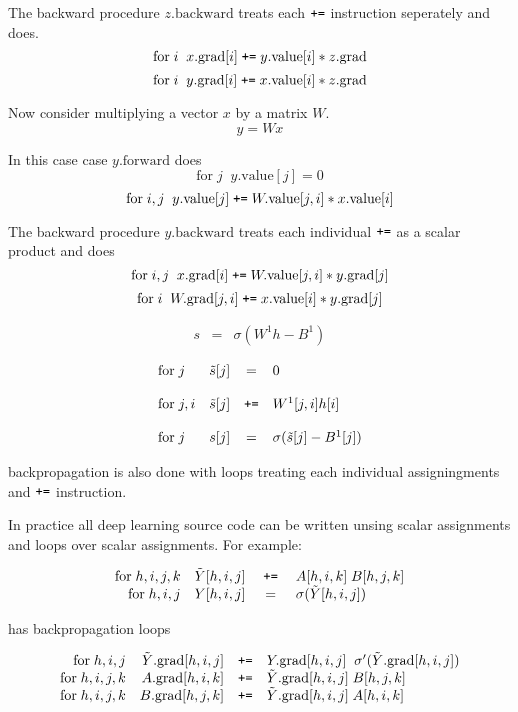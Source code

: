 {\vfill
The backward procedure $z.\mathrm{backward}$ treats each $\mbox{\tt +=}$ instruction seperately and does.
$$\mathrm{for}\;i\;\;x.\mathrm{grad}[i] \;\mbox{\tt +=}\;y.\mathrm{value}[i]*z.\mathrm{grad}$$
$$\mathrm{for}\;i\;\;y.\mathrm{grad}[i] \;\mbox{\tt +=}\;x.\mathrm{value}[i]*z.\mathrm{grad}$$

Now consider multiplying a vector $x$ by a matrix $W$.
$$y = Wx$$

\vfill
In this case case $y.\mathrm{forward}$ does
$$\mathrm{for}\;j\;\;y.\mathrm{value}[j] = 0$$
$$\mathrm{for}\;i,j\;\;y.\mathrm{value}[j] \;\mbox{\tt +=}\;W.\mathrm{value}[j,i]*x.\mathrm{value}[i]$$

\vfill
The backward procedure $y.\mathrm{backward}$ treats each individual $\mbox{\tt +=}$ as a scalar product and does
$$\mathrm{for}\;i,j\;\;x.\mathrm{grad}[i] \;\mbox{\tt +=}\;W.\mathrm{value}[j,i]*y.\mathrm{grad}[j]$$
$$\mathrm{for}\;i\;\;W.\mathrm{grad}[j,i] \;\mbox{\tt +=}\;x.\mathrm{value}[i]*y.\mathrm{grad}[j]$$


\begin{eqnarray*}
   s & = & \sigma\left(W^1h - B^1 \right)
\end{eqnarray*}

\vfill
$$\begin{array}{lrcl}
\mathrm{for}\;j &  \tilde{s}[j] & = & 0 \\
\\
\mathrm{for}\;j,i &  \tilde{s}[j] & \mbox{\tt +=} &  W^1[j,i]h[i] \\
\\
\mathrm{for}\; j & s[j] & = & \sigma(\tilde{s}[j] - B^1[j])
\end{array}$$

\vfill
backpropagation is also done with loops treating each individual assigningments and $\mbox{\tt +=}$ instruction.


In practice all deep learning source code can be written unsing scalar assignments and loops over scalar assignments.
For example:

$$\begin{array}{rrcl}
\mathrm{for}\; h,i,j,k & \tilde{Y}[h,i,j] & \;\mbox{\tt +=}\; & A[h,i,k]\;B[h,j,k] \\
\mathrm{for}\; h,i,j & Y[h,i,j] & = & \sigma(\tilde{Y}[h,i,j])
\end{array}$$

\vfill
has backpropagation loops

$$\begin{array}{rrcl}
\mathrm{for}\;h,i,j & \tilde{Y}.\mathrm{grad}[h,i,j] & \mbox{\tt +=} & Y.\mathrm{grad}[h,i,j]\;\;\sigma'(\tilde{Y}.\mathrm{grad}[h,i,j]) \\
\mathrm{for}\;h,i,j,k & A.\mathrm{grad}[h,i,k] & \mbox{\tt +=} & \tilde{Y}.\mathrm{grad}[h,i,j] \;B[h,j,k] \\
\mathrm{for}\;h,i,j,k & B.\mathrm{grad}[h,j,k] & \mbox{\tt +=} & \tilde{Y}.\mathrm{grad}[h,i,j]\;A[h,i,k]
\end{array}$$

}


